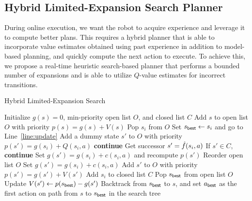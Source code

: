 \subsection{Hybrid Limited-Expansion Search Planner}
\label{sec:integrating-q-values}

During online execution, we want the robot to acquire experience
and leverage it to compute better plans. This requires a hybrid planner that
is able to incorporate value estimates obtained using past experience
in addition to model-based planning, and quickly compute the next
action to execute. To achieve this, we propose a real-time
heuristic search-based planner that performs a bounded number of
expansions and is able to utilize $Q$-value estimates for incorrect
transitions.


\begin{algorithm}[t]
  \caption{Hybrid Limited-Expansion Search}
  {\normalsize
  \begin{algorithmic}[1]
      \State Initialize $g(s)=0$, min-priority open list $O$, and closed list $C$
      \State Add $s$ to open list $O$ with priority $p(s) = g(s) + V(s)$
      	\State Pop $s_i$ from $O$
      	\State Set $s_{\mathsf{best}} \leftarrow s_i$ and go to Line~\ref{line:update}\label{line:jump}
      	\EndIf
      		\State Add a dummy state $s'$ to $O$ with priority $p(s') = g(s_i) + Q(s_i, a)$\label{line:dummy}
     		\State \textbf{continue}
      		\EndIf
      		\State Get successor $s' = \hat{f}(s_i, a)$
      		\State If $s' \in C$, \textbf{continue}
      			\State Set $g(s') = g(s_i) + c(s_i, a)$ and recompute $p(s')$
      			\State Reorder open list $O$
      			\State Set $g(s') = g(s_i) + c(s_i, a)$
      			\State Add $s'$ to $O$ with priority $p(s') = g(s') + V(s')$
      		\EndIf
      	\EndFor
      	\State Add $s_i$ to closed list $C$
      \EndFor
      \State Pop $s_{\mathsf{best}}$ from open list $O$\label{line:best}
      \label{line:update}
      	\State Update $V(s') \leftarrow p(s_{\mathsf{best}}) - g(s')$\label{line:update2}
      \EndFor
      \State Backtrack from $s_{\mathsf{best}}$ to $s$, and set $a_{\mathsf{best}}$ as the first action on path from $s$ to $s_{\mathsf{best}}$ in the search tree\label{line:best-action}
		      
    \EndProcedure
  \end{algorithmic}}
  \label{alg:hybrid-limited-expansion-search}
\end{algorithm}

